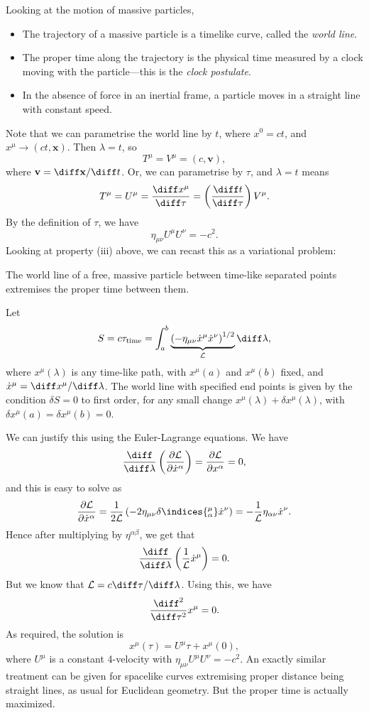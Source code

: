 \documentclass[12pt]{article}
\begin{document}
Looking at the motion of massive particles,
\begin{itemize}[(i)]
	\item The trajectory of a massive particle is a timelike curve, called the \emph{world line}.
	\item The proper time along the trajectory is the physical time measured by a clock moving with the particle---this is the \emph{clock postulate}.
	\item In the absence of force in an inertial frame, a particle moves in a straight line with constant speed.
\end{itemize}

Note that we can parametrise the world line by $t$, where $x^0 = ct$, and $x^\mu \to (ct, \mathbf{x})$. Then $\lambda = t$, so
\[
T^\mu = V^\mu = (c, \mathbf{v}),
\]
where $\mathbf{v} = \diff \mathbf{x}/\diff t$. Or, we can parametrise by $\tau$, and $\lambda = t$ means
\[
T^\mu = U^\mu = \frac{\diff x^\mu}{\diff \tau} = \left( \frac{\diff t}{\diff \tau} \right) V^\mu.
\]
By the definition of $\tau$, we have
\[
\eta_{\mu \nu} U^\mu U^\nu = -c^2.
\]
Looking at property (iii) above, we can recast this as a variational problem:
\begin{center}
	The world line of a free, massive particle between time-like separated points extremises the proper time between them.
\end{center}
Let
\[
	S = c \tau_{\mathrm{time}} = \int_a^b \underbrace{\left( - \eta_{\mu \nu} \dot x^\mu \dot x^\nu \right)^{1/2}}_{\mathcal{L}} \diff \lambda,
\]
where $x^\mu(\lambda)$ is any time-like path, with $x^\mu(a)$ and $x^\mu(b)$ fixed, and $\dot x^\mu = \diff x^\mu / \diff \lambda$. The world line with specified end points is given by the condition $\delta S = 0$ to first order, for any small change $x^\mu(\lambda) + \delta x^\mu(\lambda)$, with $\delta x^\mu(a) = \delta x^\mu(b) = 0$.

We can justify this using the Euler-Lagrange equations. We have
\[
\frac{\diff}{\diff \lambda} \left( \frac{\partial \mathcal{L}}{ \partial \dot x^\alpha} \right) = \frac{\partial \mathcal{L}}{\partial x^\alpha} = 0,
\]
and this is easy to solve as
\[
	\frac{\partial \mathcal{L}}{\partial \dot x^\alpha} = \frac{1}{2\mathcal{L}} \left( - 2 \eta_{\mu \nu} \delta\indices{_\alpha^\mu} \dot x^\nu \right) = - \frac{1}{\mathcal{L}} \eta_{\alpha \nu} \dot x^\nu.
\]
Hence after multiplying by $\eta^{\alpha \beta}$, we get that
\[
\frac{\diff}{\diff \lambda} \left( \frac{1}{\mathcal{L}}\dot x^\mu \right) = 0.
\]
But we know that $\mathcal{L} = c \diff \tau/\diff \lambda$. Using this, we have
\[
\frac{\diff^2}{\diff \tau^2} x^\mu = 0.
\]
As required, the solution is
\[
x^\mu(\tau) = U^\mu \tau + x^\mu(0),
\]
where $U^\mu$ is a constant 4-velocity with $\eta_{\mu \nu}U^\mu U^\nu = -c^2$. An exactly similar treatment can be given for spacelike curves extremising proper distance being straight lines, as usual for Euclidean geometry. But the proper time is actually maximized.
\end{document}
